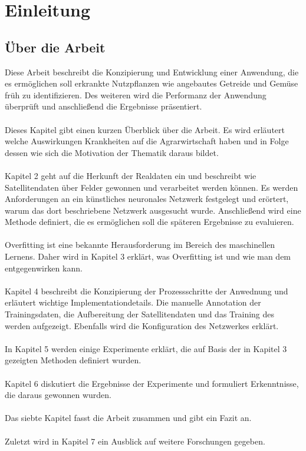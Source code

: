 \chapter{Einleitung}\label{chap:introduction}

\section{Über die Arbeit}

Diese Arbeit beschreibt die Konzipierung und Entwicklung einer Anwendung, die es ermöglichen soll erkrankte Nutzpflanzen wie angebautes Getreide und Gemüse früh zu identifizieren. Des weiteren wird die Performanz der Anwendung überprüft und anschließend die Ergebnisse präsentiert.
\\\\
Dieses Kapitel gibt einen kurzen Überblick über die Arbeit. Es wird erläutert welche Auswirkungen Krankheiten auf die Agrarwirtschaft haben und in Folge dessen wie sich die Motivation der Thematik daraus bildet.
\\\\
Kapitel 2 geht auf die Herkunft der Realdaten ein und beschreibt wie Satellitendaten über Felder gewonnen und verarbeitet werden können. Es werden Anforderungen an ein künstliches neuronales Netzwerk festgelegt und erörtert, warum das dort beschriebene Netzwerk ausgesucht wurde. Anschließend wird eine Methode definiert, die es ermöglichen soll die späteren Ergebnisse zu evaluieren.
\\\\
Overfitting ist eine bekannte Herausforderung im Bereich des maschinellen Lernens. Daher wird in Kapitel 3 erklärt, was Overfitting ist und wie man dem entgegenwirken kann.
\\\\
Kapitel 4 beschreibt die Konzipierung der Prozessschritte der Anwednung und erläutert wichtige Implementationdetails. Die manuelle Annotation der Trainingsdaten, die Aufbereitung der Satellitendaten und das Training des werden aufgezeigt. Ebenfalls wird die Konfiguration des Netzwerkes erklärt.
\\\\
In Kapitel 5 werden einige Experimente erklärt, die auf Basis der in Kapitel 3 gezeigten Methoden definiert wurden.
\\\\
Kapitel 6 diskutiert die Ergebnisse der Experimente und formuliert Erkenntnisse, die daraus gewonnen wurden.
\\\\
Das siebte Kapitel fasst die Arbeit zusammen und gibt ein Fazit an.
\\\\
Zuletzt wird in Kapitel 7 ein Ausblick auf weitere Forschungen gegeben.

